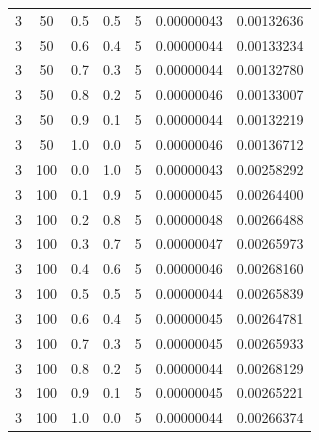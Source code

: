 \documentclass[12pt, a4paper]{report}
\begin{document}
\begin{table} [H]
\begin{tabular}[l]{|c c c c c c c|}
			3 & 50 & 0.5 & 0.5 & 5 & 0.00000043 & 0.00132636 \\
			
			3 & 50 & 0.6 & 0.4 & 5 & 0.00000044 & 0.00133234 \\
			
			3 & 50 & 0.7 & 0.3 & 5 & 0.00000044 & 0.00132780 \\
			
			3 & 50 & 0.8 & 0.2 & 5 & 0.00000046 & 0.00133007 \\
			
			3 & 50 & 0.9 & 0.1 & 5 & 0.00000044 & 0.00132219 \\
			
			3 & 50 & 1.0 & 0.0 & 5 & 0.00000046 & 0.00136712 \\
			
			3 & 100 & 0.0 & 1.0 & 5 & 0.00000043 & 0.00258292 \\
			
			3 & 100 & 0.1 & 0.9 & 5 & 0.00000045 & 0.00264400 \\
			
			3 & 100 & 0.2 & 0.8 & 5 & 0.00000048 & 0.00266488 \\
			
			3 & 100 & 0.3 & 0.7 & 5 & 0.00000047 & 0.00265973 \\
			
			3 & 100 & 0.4 & 0.6 & 5 & 0.00000046 & 0.00268160 \\
			
			3 & 100 & 0.5 & 0.5 & 5 & 0.00000044 & 0.00265839 \\
			
			3 & 100 & 0.6 & 0.4 & 5 & 0.00000045 & 0.00264781 \\
			
			3 & 100 & 0.7 & 0.3 & 5 & 0.00000045 & 0.00265933 \\
			
			3 & 100 & 0.8 & 0.2 & 5 & 0.00000044 & 0.00268129 \\
			
			3 & 100 & 0.9 & 0.1 & 5 & 0.00000045 & 0.00265221 \\
			
			3 & 100 & 1.0 & 0.0 & 5 & 0.00000044 & 0.00266374 \\\hline
		\end{tabular}
	\end{table}
	
\end{document}
